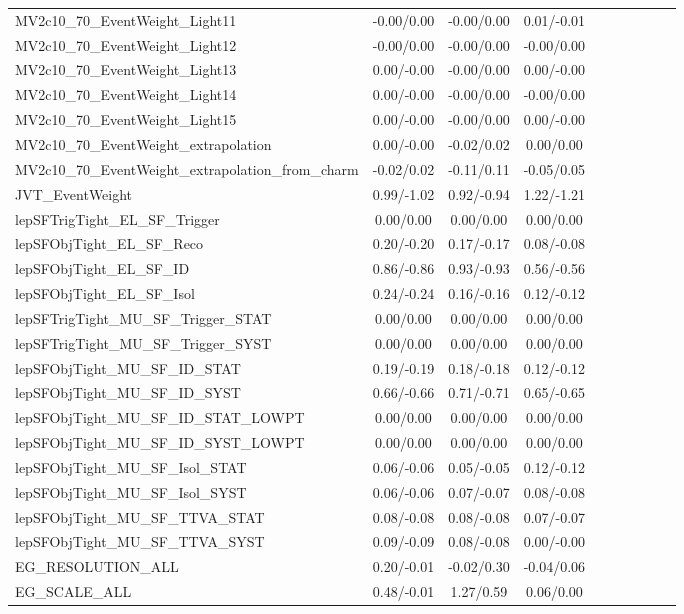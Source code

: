 \begin{table}[h]
\begin{center}
\begin{tabular}{l|ccccccccc}
MV2c10\_70\_EventWeight\_Light11 &-0.00/0.00 &-0.00/0.00 &0.01/-0.01 \\
MV2c10\_70\_EventWeight\_Light12 &-0.00/0.00 &-0.00/0.00 &-0.00/0.00 \\
MV2c10\_70\_EventWeight\_Light13 &0.00/-0.00 &-0.00/0.00 &0.00/-0.00 \\
MV2c10\_70\_EventWeight\_Light14 &0.00/-0.00 &-0.00/0.00 &-0.00/0.00 \\
MV2c10\_70\_EventWeight\_Light15 &0.00/-0.00 &-0.00/0.00 &0.00/-0.00 \\
MV2c10\_70\_EventWeight\_extrapolation &0.00/-0.00 &-0.02/0.02 &0.00/0.00 \\
MV2c10\_70\_EventWeight\_extrapolation\_from\_charm &-0.02/0.02 &-0.11/0.11 &-0.05/0.05 \\
JVT\_EventWeight &0.99/-1.02 &0.92/-0.94 &1.22/-1.21 \\
lepSFTrigTight\_EL\_SF\_Trigger &0.00/0.00 &0.00/0.00 &0.00/0.00 \\
lepSFObjTight\_EL\_SF\_Reco &0.20/-0.20 &0.17/-0.17 &0.08/-0.08 \\
lepSFObjTight\_EL\_SF\_ID &0.86/-0.86 &0.93/-0.93 &0.56/-0.56 \\
lepSFObjTight\_EL\_SF\_Isol &0.24/-0.24 &0.16/-0.16 &0.12/-0.12 \\
lepSFTrigTight\_MU\_SF\_Trigger\_STAT &0.00/0.00 &0.00/0.00 &0.00/0.00 \\
lepSFTrigTight\_MU\_SF\_Trigger\_SYST &0.00/0.00 &0.00/0.00 &0.00/0.00 \\
lepSFObjTight\_MU\_SF\_ID\_STAT &0.19/-0.19 &0.18/-0.18 &0.12/-0.12 \\
lepSFObjTight\_MU\_SF\_ID\_SYST &0.66/-0.66 &0.71/-0.71 &0.65/-0.65 \\
lepSFObjTight\_MU\_SF\_ID\_STAT\_LOWPT &0.00/0.00 &0.00/0.00 &0.00/0.00 \\
lepSFObjTight\_MU\_SF\_ID\_SYST\_LOWPT &0.00/0.00 &0.00/0.00 &0.00/0.00 \\
lepSFObjTight\_MU\_SF\_Isol\_STAT &0.06/-0.06 &0.05/-0.05 &0.12/-0.12 \\
lepSFObjTight\_MU\_SF\_Isol\_SYST &0.06/-0.06 &0.07/-0.07 &0.08/-0.08 \\
lepSFObjTight\_MU\_SF\_TTVA\_STAT &0.08/-0.08 &0.08/-0.08 &0.07/-0.07 \\
lepSFObjTight\_MU\_SF\_TTVA\_SYST &0.09/-0.09 &0.08/-0.08 &0.00/-0.00 \\
EG\_RESOLUTION\_ALL &0.20/-0.01 &-0.02/0.30 &-0.04/0.06 \\
EG\_SCALE\_ALL &0.48/-0.01 &1.27/0.59 &0.06/0.00 \\

\end{tabular}
\end{center}
\end{table}
